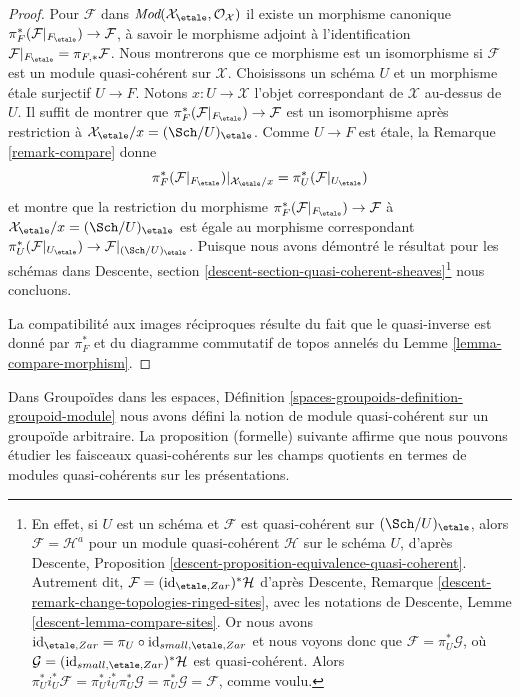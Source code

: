 \begin{proof}
\medskip\noindent
Pour $\mathcal{F}$ dans
$\textit{Mod}(\mathcal{X}_\etale, \mathcal{O}_\mathcal{X})$
il existe un morphisme canonique $\pi_F^*(\mathcal{F}|_{F_\etale}) \to \mathcal{F}$,
à savoir le morphisme adjoint à l'identification
$\mathcal{F}|_{F_\etale} = \pi_{F, *}\mathcal{F}$.
Nous montrerons que ce morphisme est un isomorphisme si $\mathcal{F}$ est
un module quasi-cohérent sur $\mathcal{X}$.
Choisissons un schéma $U$ et un morphisme \'etale surjectif $U \to F$.
Notons $x : U \to \mathcal{X}$ l'objet correspondant de $\mathcal{X}$
au-dessus de $U$. Il suffit de montrer que
$\pi_F^*(\mathcal{F}|_{F_\etale}) \to \mathcal{F}$ est un isomorphisme
après restriction à $\mathcal{X}_\etale/x = (\Sch/U)_\etale$.
Comme $U \to F$ est \'etale, la Remarque \ref{remark-compare} donne
$$
\pi_F^*(\mathcal{F}|_{F_\etale})|_{\mathcal{X}_\etale/x} =
\pi_U^*(\mathcal{F}|_{U_\etale})
$$
et montre que la restriction du morphisme
$\pi_F^*(\mathcal{F}|_{F_\etale}) \to \mathcal{F}$
à $\mathcal{X}_\etale/x = (\Sch/U)_\etale$
est égale au morphisme correspondant
$\pi_U^*(\mathcal{F}|_{U_\etale}) \to \mathcal{F}|_{(\Sch/U)_\etale}$.
Puisque nous avons démontré le résultat pour les schémas dans
Descente, section \ref{descent-section-quasi-coherent-sheaves}\footnote{En effet,
si $U$ est un schéma et $\mathcal{F}$ est quasi-cohérent sur
$(\Sch/U)_\etale$, alors $\mathcal{F} = \mathcal{H}^a$ pour un
module quasi-cohérent $\mathcal{H}$ sur le schéma $U$, d'après
Descente, Proposition \ref{descent-proposition-equivalence-quasi-coherent}.
Autrement dit, $\mathcal{F} = (\text{id}_{\etale,Zar})^*\mathcal{H}$
d'après Descente, Remarque \ref{descent-remark-change-topologies-ringed-sites},
avec les notations de Descente, Lemme \ref{descent-lemma-compare-sites}.
Or nous avons
$\text{id}_{\etale,Zar} = \pi_U \circ \text{id}_{small,\etale,Zar}$
et nous voyons donc que $\mathcal{F} = \pi_U^*\mathcal{G}$, où
$\mathcal{G} = (\text{id}_{small,\etale,Zar})^*\mathcal{H}$ est
quasi-cohérent. Alors
$\pi_U^*i_U^*\mathcal{F} = \pi_U^*i_U^*\pi_U^*\mathcal{G} =
\pi_U^*\mathcal{G} = \mathcal{F}$, comme voulu.}
nous concluons.

\medskip\noindent
La compatibilité aux images réciproques résulte du fait que
le quasi-inverse est donné par $\pi_F^*$ et du
diagramme commutatif de topos annelés du
Lemme \ref{lemma-compare-morphism}.
\end{proof}

\noindent
Dans
Groupoïdes dans les espaces, Définition
\ref{spaces-groupoids-definition-groupoid-module}
nous avons défini la notion de module quasi-cohérent
sur un groupoïde arbitraire. La proposition (formelle) suivante affirme
que nous pouvons étudier les faisceaux quasi-cohérents sur les champs quotients
en termes de modules quasi-cohérents sur les présentations.

